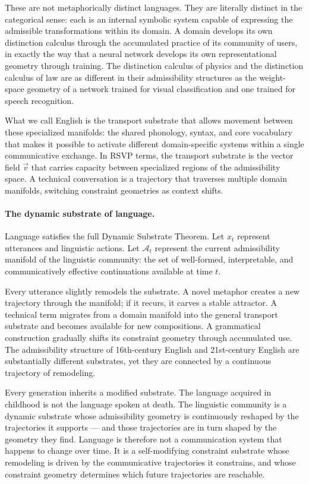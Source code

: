 \documentclass[12pt,a4paper]{article}
\begin{document}
These are not metaphorically distinct languages. They are literally distinct in the categorical sense: each is an internal symbolic system capable of expressing the admissible transformations within its domain. A domain develops its own distinction calculus through the accumulated practice of its community of users, in exactly the way that a neural network develops its own representational geometry through training. The distinction calculus of physics and the distinction calculus of law are as different in their admissibility structures as the weight-space geometry of a network trained for visual classification and one trained for speech recognition.

What we call English is the transport substrate that allows movement between these specialized manifolds: the shared phonology, syntax, and core vocabulary that makes it possible to activate different domain-specific systems within a single communicative exchange. In RSVP terms, the transport substrate is the vector field $\vec{v}$ that carries capacity between specialized regions of the admissibility space. A technical conversation is a trajectory that traverses multiple domain manifolds, switching constraint geometries as context shifts.

\paragraph{The dynamic substrate of language.}
Language satisfies the full Dynamic Substrate Theorem. Let $x_t$ represent utterances and linguistic actions. Let $\mathcal{A}_t$ represent the current admissibility manifold of the linguistic community: the set of well-formed, interpretable, and communicatively effective continuations available at time $t$.

Every utterance slightly remodels the substrate. A novel metaphor creates a new trajectory through the manifold; if it recurs, it carves a stable attractor. A technical term migrates from a domain manifold into the general transport substrate and becomes available for new compositions. A grammatical construction gradually shifts its constraint geometry through accumulated use. The admissibility structure of 16th-century English and 21st-century English are substantially different substrates, yet they are connected by a continuous trajectory of remodeling.

Every generation inherits a modified substrate. The language acquired in childhood is not the language spoken at death. The linguistic community is a dynamic substrate whose admissibility geometry is continuously reshaped by the trajectories it supports — and those trajectories are in turn shaped by the geometry they find. Language is therefore not a communication system that happens to change over time. It is a self-modifying constraint substrate whose remodeling is driven by the communicative trajectories it constrains, and whose constraint geometry determines which future trajectories are reachable.
\end{document}

